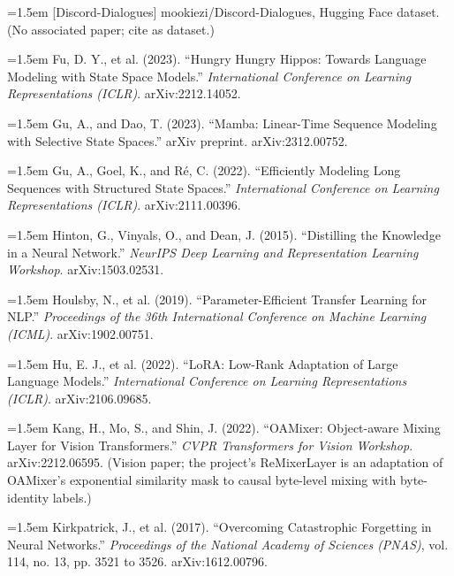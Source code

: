 \documentclass[11pt]{article}
\begin{document}
\par\hangindent=1.5em [Discord-Dialogues] mookiezi/Discord-Dialogues, Hugging Face dataset. (No associated paper; cite as dataset.)

\par\hangindent=1.5em Fu, D. Y., et al. (2023). ``Hungry Hungry Hippos: Towards Language Modeling with State Space Models.'' \emph{International Conference on Learning Representations (ICLR)}. arXiv:2212.14052.

\par\hangindent=1.5em Gu, A., and Dao, T. (2023). ``Mamba: Linear-Time Sequence Modeling with Selective State Spaces.'' arXiv preprint. arXiv:2312.00752.

\par\hangindent=1.5em Gu, A., Goel, K., and R\'e, C. (2022). ``Efficiently Modeling Long Sequences with Structured State Spaces.'' \emph{International Conference on Learning Representations (ICLR)}. arXiv:2111.00396.

\par\hangindent=1.5em Hinton, G., Vinyals, O., and Dean, J. (2015). ``Distilling the Knowledge in a Neural Network.'' \emph{NeurIPS Deep Learning and Representation Learning Workshop}. arXiv:1503.02531.

\par\hangindent=1.5em Houlsby, N., et al. (2019). ``Parameter-Efficient Transfer Learning for NLP.'' \emph{Proceedings of the 36th International Conference on Machine Learning (ICML)}. arXiv:1902.00751.

\par\hangindent=1.5em Hu, E. J., et al. (2022). ``LoRA: Low-Rank Adaptation of Large Language Models.'' \emph{International Conference on Learning Representations (ICLR)}. arXiv:2106.09685.

\par\hangindent=1.5em Kang, H., Mo, S., and Shin, J. (2022). ``OAMixer: Object-aware Mixing Layer for Vision Transformers.'' \emph{CVPR Transformers for Vision Workshop}. arXiv:2212.06595. (Vision paper; the project's ReMixerLayer is an adaptation of OAMixer's exponential similarity mask to causal byte-level mixing with byte-identity labels.)

\par\hangindent=1.5em Kirkpatrick, J., et al. (2017). ``Overcoming Catastrophic Forgetting in Neural Networks.'' \emph{Proceedings of the National Academy of Sciences (PNAS)}, vol. 114, no. 13, pp. 3521 to 3526. arXiv:1612.00796.
\end{document}
